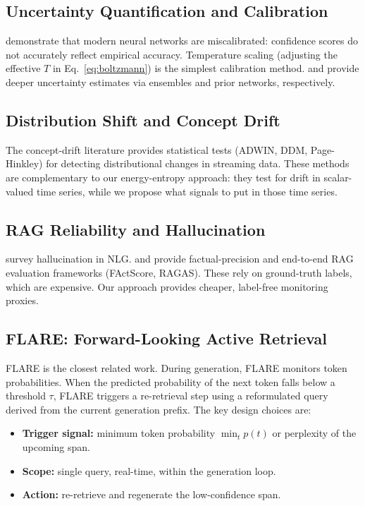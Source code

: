 \documentclass[11pt,a4paper]{article}
\theoremstyle{definition}
\begin{document}
\subsection{Uncertainty Quantification and Calibration}

\citet{guo2017calibration} demonstrate that modern neural networks are
miscalibrated: confidence scores do not accurately reflect empirical accuracy.
Temperature scaling (adjusting the effective $T$ in
Eq.~\eqref{eq:boltzmann}) is the simplest calibration method.
\citet{lakshminarayanan2017} and \citet{malinin2018predictive} provide
deeper uncertainty estimates via ensembles and prior networks, respectively.

\subsection{Distribution Shift and Concept Drift}

The concept-drift literature \citep{gama2014survey} provides
statistical tests (ADWIN, DDM, Page-Hinkley) for detecting
distributional changes in streaming data.
These methods are complementary to our energy-entropy approach:
they test for drift in scalar-valued time series, while we propose
what signals to put in those time series.

\subsection{RAG Reliability and Hallucination}

\citet{ji2023survey} survey hallucination in NLG.
\citet{min2023factscore} and \citet{es2023ragas} provide
factual-precision and end-to-end RAG evaluation frameworks (FActScore,
RAGAS).
These rely on ground-truth labels, which are expensive.
Our approach provides cheaper, label-free monitoring proxies.

\subsection{FLARE: Forward-Looking Active Retrieval}
\label{sec:flare_review}

FLARE \citep{jiang2023flare} is the closest related work.
During generation, FLARE monitors token probabilities.
When the predicted probability of the next token falls below a threshold
$\tau$, FLARE triggers a re-retrieval step using a reformulated query
derived from the current generation prefix.
The key design choices are:
\begin{itemize}[noitemsep]
  \item \textbf{Trigger signal:} minimum token probability $\min_t p(t)$
    or perplexity of the upcoming span.
  \item \textbf{Scope:} single query, real-time, within the generation
    loop.
  \item \textbf{Action:} re-retrieve and regenerate the low-confidence
    span.
\end{itemize}
\end{document}
